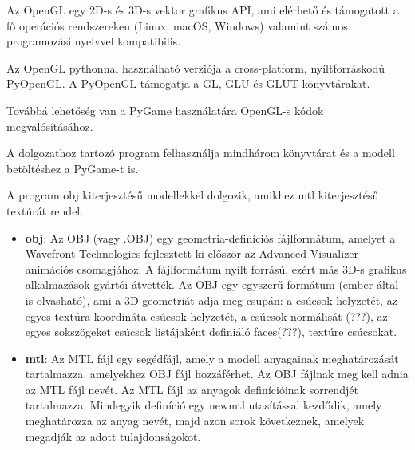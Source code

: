 




Az OpenGL egy 2D-s és 3D-s vektor grafikus  API, ami elérhető és támogatott a fő operációs rendszereken (Linux, macOS, Windows) valamint számos programozási nyelvvel kompatibilis.

Az OpenGL pythonnal használható verziója a cross-platform, nyíltforráskodú PyOpenGL. A PyOpenGL támogatja a GL, GLU és GLUT könyvtárakat. 

Továbbá lehetőség van a PyGame használatára OpenGL-s kódok megvalósításához.

A dolgozathoz tartozó program felhasználja mindhárom könyvtárat és a modell betöltéshez a PyGame-t is.

A program obj kiterjesztésű modellekkel dolgozik, amikhez mtl kiterjesztésű textúrát rendel. 
\begin{itemize}
\item {\bf obj}: Az OBJ (vagy .OBJ) egy geometria-definíciós fájlformátum, amelyet a Wavefront Technologies fejlesztett ki először az Advanced Visualizer animációs csomagjához. A fájlformátum nyílt forrású, ezért más 3D-s grafikus alkalmazások gyártói átvették.
Az OBJ egy egyszerű formátum (ember által is olvasható), ami a 3D geometriát adja meg csupán: a csúcsok helyzetét, az egyes textúra koordináta-csúcsok helyzetét, a csúcsok normálisát (???), az egyes sokszögeket csúcsok listájaként definiáló faces(???), textúre csúcsokat.  
\item {\bf mtl}: Az MTL fájl egy segédfájl, amely a modell anyagainak meghatározását tartalmazza, amelyekhez OBJ fájl hozzáférhet. Az OBJ fájlnak meg kell adnia az MTL fájl nevét. Az MTL fájl az anyagok definícióinak sorrendjét tartalmazza. Mindegyik definíció egy newmtl utasítással kezdődik, amely meghatározza az anyag nevét, majd azon sorok következnek, amelyek megadják az adott tulajdonságokot.
\end{itemize} 

